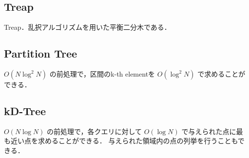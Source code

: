 \subsection{Treap}
Treap．乱択アルゴリズムを用いた平衡二分木である．


\subsection{Partition Tree}
$O(N \log^2 N)$ の前処理で，区間のk-th elementを $O(\log^2 N)$ で求めることができる．


\subsection{kD-Tree}
$O(N \log N)$ の前処理で，各クエリに対して $O(\log N)$ で与えられた点に最も近い点を求めることができる．
与えられた領域内の点の列挙を行うこともできる．

